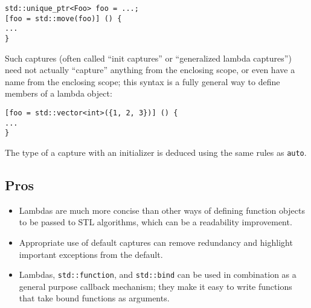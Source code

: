 \begin{verbatim}
std::unique_ptr<Foo> foo = ...;
[foo = std::move(foo)] () {
...
}
\end{verbatim}
Such captures (often called \enquote{init captures} or \enquote{generalized lambda captures}) need not actually \enquote{capture} anything from the enclosing scope, or even have a name from the enclosing scope; this syntax is a fully general way to define members of a lambda object:
\begin{verbatim}
[foo = std::vector<int>({1, 2, 3})] () {
...
}
\end{verbatim}
The type of a capture with an initializer is deduced using the same rules as \texttt{auto}.


\subsection{Pros}
\begin{itemize}
\item Lambdas are much more concise than other ways of defining function objects to be passed to STL algorithms, which can be a readability improvement.
\item Appropriate use of default captures can remove redundancy and highlight important exceptions from the default.
\item Lambdas, \texttt{std::function}, and \texttt{std::bind} can be used in combination as a general purpose callback mechanism; they make it easy to write functions that take bound functions as arguments.
\end{itemize}

